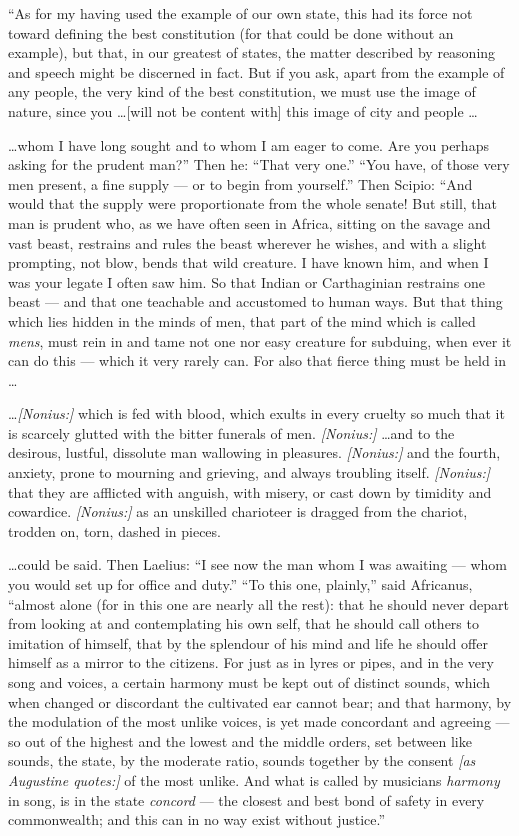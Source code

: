  ``As for my having used the example of our own state, this had its force not toward defining the best constitution (for that could be done without an example), but that, in our greatest of states, the matter described by reasoning and speech might be discerned in fact. But if you ask, apart from the example of any people, the very kind of the best constitution, we must use the image of nature, since you \ldots [will not be content with] this image of city and people \ldots

 \ldots whom I have long sought and to whom I am eager to come. Are you perhaps asking for the prudent man?'' Then he: ``That very one.'' ``You have, of those very men present, a fine supply --- or to begin from yourself.'' Then Scipio: ``And would that the supply were proportionate from the whole senate! But still, that man is prudent who, as we have often seen in Africa, sitting on the savage and vast beast, restrains and rules the beast wherever he wishes, and with a slight prompting, not blow, bends that wild creature. I have known him, and when I was your legate I often saw him. So that Indian or Carthaginian restrains one beast --- and that one teachable and accustomed to human ways. But that thing which lies hidden in the minds of men, that part of the mind which is called \textit{mens}, must rein in and tame not one nor easy creature for subduing, when ever it can do this --- which it very rarely can. For also that fierce thing must be held in \ldots

 \ldots \textit{[Nonius:]} which is fed with blood, which exults in every cruelty so much that it is scarcely glutted with the bitter funerals of men. \textit{[Nonius:]} \ldots and to the desirous, lustful, dissolute man wallowing in pleasures. \textit{[Nonius:]} and the fourth, anxiety, prone to mourning and grieving, and always troubling itself. \textit{[Nonius:]} that they are afflicted with anguish, with misery, or cast down by timidity and cowardice. \textit{[Nonius:]} as an unskilled charioteer is dragged from the chariot, trodden on, torn, dashed in pieces.

 \ldots could be said. Then Laelius: ``I see now the man whom I was awaiting --- whom you would set up for office and duty.'' ``To this one, plainly,'' said Africanus, ``almost alone (for in this one are nearly all the rest): that he should never depart from looking at and contemplating his own self, that he should call others to imitation of himself, that by the splendour of his mind and life he should offer himself as a mirror to the citizens. For just as in lyres or pipes, and in the very song and voices, a certain harmony must be kept out of distinct sounds, which when changed or discordant the cultivated ear cannot bear; and that harmony, by the modulation of the most unlike voices, is yet made concordant and agreeing --- so out of the highest and the lowest and the middle orders, set between like sounds, the state, by the moderate ratio, sounds together by the consent \textit{[as Augustine quotes:]} of the most unlike. And what is called by musicians \textit{harmony} in song, is in the state \textit{concord} --- the closest and best bond of safety in every commonwealth; and this can in no way exist without justice.''

